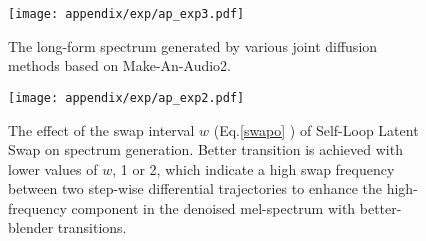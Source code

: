 \begin{figure}[!t]
    \centering
    \vspace{-5pt}
    \texttt{[image: appendix/exp/ap\_exp3.pdf]}
    \vspace{-20pt}
    \caption{The long-form spectrum generated by various joint diffusion methods based on Make-An-Audio2. }
    \vspace{-15pt}
\label{fig:ap1}
\end{figure}




\begin{figure*}[t]
    \centering
    \texttt{[image: appendix/exp/ap\_exp2.pdf]}
    \caption{The effect of the swap interval $w$ (Eq.\ref{swapo} ) of Self-Loop Latent Swap on spectrum generation. Better transition is achieved with lower values of $w$, 1 or 2, which indicate a high swap frequency between two step-wise differential trajectories to enhance the high-frequency component in the denoised mel-spectrum with better-blender transitions.}
    \vspace{-10pt}
    \label{fig:ap3}
\end{figure*} 


